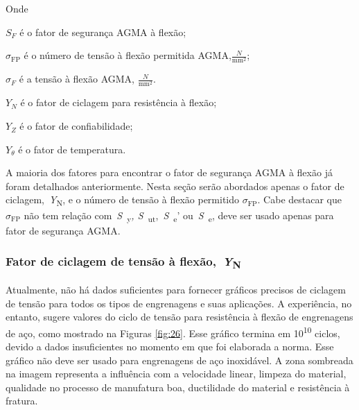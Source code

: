 \documentclass[12pt,a4paper]{article}
\begin{document}
Onde

\(S_{F}\) é o fator de segurança AGMA à flexão;

\(\sigma_{\text{FP}}\) é o número de tensão à flexão permitida
AGMA,\(\frac{N}{\text{mm}^{2}}\);

\(\sigma_{F}\) é a tensão à flexão AGMA, \(\frac{N}{\text{mm}^{2}}.\)

\(Y_{N}\) é o fator de ciclagem para resistência à flexão;

\(Y_{Z}\) é o fator de confiabilidade;

\(Y_{\theta}\) é o fator de temperatura.

A maioria dos fatores para encontrar o fator de segurança AGMA à flexão
já foram detalhados anteriormente. Nesta seção serão abordados apenas o
fator de ciclagem,~\emph{Y}\textsubscript{N}, e o número de tensão à
flexão permitido $\sigma_{\text{FP}}$. Cabe destacar que $\sigma_{\text{FP}}$ não tem relação
com~\emph{S}~\textsubscript{y}\emph{,
S}~\textsubscript{ut},~\emph{S}~\textsubscript{e}'
ou~\emph{S}~\textsubscript{e}, deve ser usado apenas para fator de
segurança AGMA.

\subsubsection*{\texorpdfstring{Fator de ciclagem de tensão à
flexão,~\emph{Y}\textsubscript{N}}{Fator de ciclagem de tensão à flexão,~YN}}

{\label{fator-de-ciclagem-de-tensuxe3o-uxe0-flexuxe3o-yn}}

Atualmente, não há dados suficientes para fornecer gráficos precisos de
ciclagem de tensão para todos os tipos de engrenagens e suas aplicações.
A experiência, no entanto, sugere valores do ciclo de tensão para
resistência à flexão de engrenagens de aço, como mostrado na Figuras
{\ref{fig:26}}. Esse gráfico termina em
10\textsuperscript{10} ciclos, devido a dados insuficientes no momento
em que foi elaborada a norma. Esse gráfico não deve ser usado para
engrenagens de aço inoxidável. A zona sombreada na imagem representa a
influência com a velocidade linear, limpeza do material, qualidade no
processo de manufatura boa, ductilidade do material e resistência à
fratura.
\end{document}
